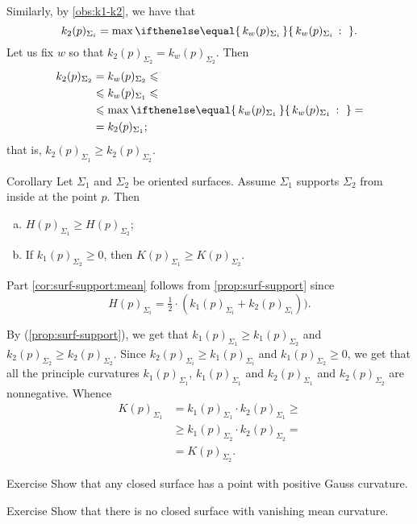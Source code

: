 Similarly, by \ref{obs:k1-k2}, we have that
\[k_2(p)_{\Sigma_i}=\max\set{k_w(p)_{\Sigma_i}}{}.\]
Let us fix $w$ so that $k_2(p)_{\Sigma_2}=k_w(p)_{\Sigma_2}$.
Then 
\begin{align*}
k_2(p)_{\Sigma_2}&=k_w(p)_{\Sigma_2}\le
\\
&\le k_w(p)_{\Sigma_1}\le
\\
&\le\max\set{k_w(p)_{\Sigma_1}}{}=
\\
&=k_2(p)_{\Sigma_1};
\end{align*}
that is, $k_2(p)_{\Sigma_1}\ge k_2(p)_{\Sigma_2}$.
\qeds

\begin{thm}{Corollary}\label{cor:surf-support}
Let $\Sigma_1$ and $\Sigma_2$ be oriented surfaces.
Assume $\Sigma_1$ supports $\Sigma_2$ from inside at the point $p$.
Then
\begin{enumerate}[(a)]
\item\label{cor:surf-support:mean} $H(p)_{\Sigma_1}\ge H(p)_{\Sigma_2}$;
\item\label{cor:surf-support:gauss} If $k_1(p)_{\Sigma_2}\ge 0$, then $K(p)_{\Sigma_1}\ge K(p)_{\Sigma_2}$.
\end{enumerate}
 
\end{thm}

 Part \ref{cor:surf-support:mean} follows from \ref{prop:surf-support} since 
\[H(p)_{\Sigma_i}=\tfrac12\cdot(k_1(p)_{\Sigma_i}+k_2(p)_{\Sigma_i})).\]

By (\ref{prop:surf-support}), we get that $k_1(p)_{\Sigma_1}\ge k_1(p)_{\Sigma_2}$ and $k_2(p)_{\Sigma_2}\ge k_2(p)_{\Sigma_2}$.
Since $k_2(p)_{\Sigma_i}\ge k_1(p)_{\Sigma_i}$ and $k_1(p)_{\Sigma_2}\ge 0$, we get that all the principle curvatures 
$k_1(p)_{\Sigma_1}$, $k_1(p)_{\Sigma_1}$ and $k_2(p)_{\Sigma_1}$ and $k_2(p)_{\Sigma_2}$ are nonnegative.
Whence
\begin{align*}
K(p)_{\Sigma_1}&=k_1(p)_{\Sigma_1}\cdot k_2(p)_{\Sigma_1}\ge 
\\
&\ge k_1(p)_{\Sigma_2}\cdot k_2(p)_{\Sigma_2}=
\\
&=K(p)_{\Sigma_2}.
\end{align*}
\qedsf




\begin{thm}{Exercise}\label{ex:positive-gauss}
Show that any closed surface has a point with positive Gauss curvature.
\end{thm}

\begin{thm}{Exercise}
Show that there is no closed surface with vanishing mean curvature.
\end{thm}

